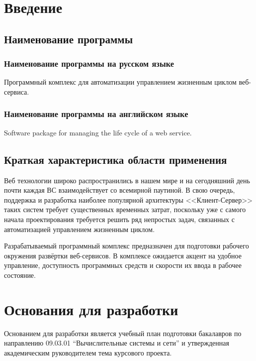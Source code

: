 \section{Введение}

\subsection{Наименование программы}

\subsubsection{Наименование программы на русском языке}

Программный комплекс для автоматизации управлением жизненным циклом веб-сервиса.

\subsubsection{Наименование программы на английском языке}

Software package for managing the life cycle of a web service.

\subsection{Краткая характеристика области применения}

Веб технологии широко распространились в нашем мире и на сегодняшний день почти каждая ВС взаимодействует со всемирной паутиной.
В свою очередь, поддержка и разработка наиболее популярной архитектуры <<Клиент-Сервер>> таких систем требует существенных временных затрат, поскольку уже с самого начала проектирования требуется решить ряд непростых задач, связанных с автоматизацией управлением жизненным циклом.

Разрабатываемый программный комплекс предназначен для подготовки рабочего окружения развёртки веб-сервисов.
В комплексе ожидается акцент на удобное управление, доступность программных средств и скорости их ввода в рабочее состояние.

\section{Основания для разработки}

Основанием для разработки является учебный план подготовки бакалавров по направлению 09.03.01 ``Вычислительные системы и сети'' и утвержденная академическим руководителем тема курсового проекта.